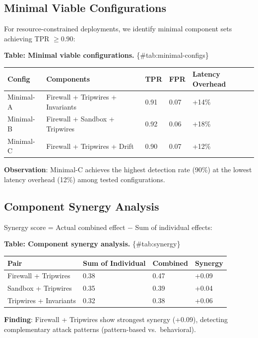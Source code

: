 \documentclass[
]{article}
\newcounter{none} %
\begin{document}
\subsection{Minimal Viable Configurations}\label{sec:minimal-config}

For resource-constrained deployments, we identify minimal component sets
achieving TPR \(\geq 0.90\):

\textbf{Table: Minimal viable configurations.} \{\#tab:minimal-configs\}

{\def\LTcaptype{none} %
\begin{longtable}[]{@{}lllll@{}}
\toprule\noalign{}
Config & Components & TPR & FPR & Latency Overhead \\
\midrule\noalign{}
\endhead
\bottomrule\noalign{}
\endlastfoot
Minimal-A & Firewall + Tripwires + Invariants & 0.91 & 0.07 & +14\% \\
Minimal-B & Firewall + Sandbox + Tripwires & 0.92 & 0.06 & +18\% \\
Minimal-C & Firewall + Tripwires + Drift & 0.90 & 0.07 & +12\% \\
\end{longtable}
}

\textbf{Observation}: Minimal-C achieves the highest detection rate
(90\%) at the lowest latency overhead (12\%) among tested
configurations.

\subsection{Component Synergy Analysis}\label{sec:synergy}

Synergy score = Actual combined effect \(-\) Sum of individual effects:

\textbf{Table: Component synergy analysis.} \{\#tab:synergy\}

{\def\LTcaptype{none} %
\begin{longtable}[]{@{}llll@{}}
\toprule\noalign{}
Pair & Sum of Individual & Combined & Synergy \\
\midrule\noalign{}
\endhead
\bottomrule\noalign{}
\endlastfoot
Firewall + Tripwires & 0.38 & 0.47 & +0.09 \\
Sandbox + Tripwires & 0.35 & 0.39 & +0.04 \\
Tripwires + Invariants & 0.32 & 0.38 & +0.06 \\
\end{longtable}
}

\textbf{Finding}: Firewall + Tripwires show strongest synergy (+0.09),
detecting complementary attack patterns (pattern-based vs.~behavioral).
\end{document}
